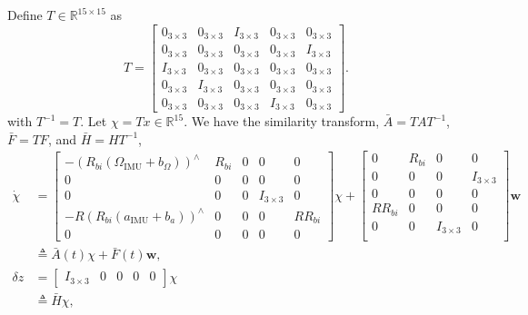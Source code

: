 \documentclass[11pt]{article}
\renewcommand{\Re}{\ensuremath{\mathbb{R}}}
\newcommand{\w}{\mathbf{w}}
\begin{document}
Define $T\in\Re^{15\times 15}$ as
\[
T=\begin{bmatrix}
0_{3\times 3}& 0_{3\times 3}& I_{3\times 3}& 0_{3\times 3}& 0_{3\times 3}\\
0_{3\times 3}& 0_{3\times 3}& 0_{3\times 3}& 0_{3\times 3}& I_{3\times 3}\\
I_{3\times 3}& 0_{3\times 3}& 0_{3\times 3}& 0_{3\times 3}& 0_{3\times 3}\\
0_{3\times 3}& I_{3\times 3}& 0_{3\times 3}& 0_{3\times 3}& 0_{3\times 3}\\
0_{3\times 3}& 0_{3\times 3}& 0_{3\times 3}& I_{3\times 3}& 0_{3\times 3}
\end{bmatrix}.
\]
with $T^{-1}=T$. Let $\chi=Tx\in\Re^{15}$. We have the similarity transform, $\bar A = TAT^{-1}$, $\bar F = TF$, and $\bar H = HT^{-1}$,
\begin{align}
\dot{\chi} &= 
\begin{bmatrix}
-(R_{bi}(\Omega_{\mathrm{IMU}}+b_\Omega))^\wedge & R_{bi} & 0 & 0 & 0\\
0 & 0 & 0 & 0 & 0\\
0 & 0 & 0 & I_{3\times 3} & 0\\
-R(R_{bi}(a_{\mathrm{IMU}}+b_a))^\wedge & 0 & 0 & 0 & R R_{bi}\\
0 & 0 & 0 & 0 & 0
\end{bmatrix}
\chi 
+
\begin{bmatrix}
0 & R_{bi} & 0 & 0 \\
0 & 0 & 0 & I_{3\times 3}\\
0 & 0  & 0 & 0 \\
R R_{bi} & 0 & 0 & 0 \\
0 & 0 & I_{3\times 3} & 0 \\
\end{bmatrix}
\w\nonumber\\
&\triangleq  \bar A(t)\chi + \bar F(t)\w,\\
\delta z & = \begin{bmatrix} I_{3\times 3} & 0 & 0 & 0 & 0\end{bmatrix}\chi\\
& \triangleq \bar H \chi,
\end{align}
\end{document}
